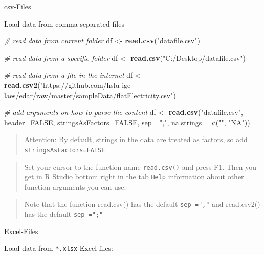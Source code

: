 \documentclass[
  a4paperpaper,
]{book}
\newenvironment{Shaded}{\begin{snugshade}}{\end{snugshade}}
\newcommand{\CommentTok}[1]{\textcolor[rgb]{0.56,0.35,0.01}{\textit{#1}}}
\newcommand{\DataTypeTok}[1]{\textcolor[rgb]{0.13,0.29,0.53}{#1}}
\newcommand{\KeywordTok}[1]{\textcolor[rgb]{0.13,0.29,0.53}{\textbf{#1}}}
\newcommand{\NormalTok}[1]{#1}
\newcommand{\OtherTok}[1]{\textcolor[rgb]{0.56,0.35,0.01}{#1}}
\newcommand{\StringTok}[1]{\textcolor[rgb]{0.31,0.60,0.02}{#1}}
\let\oldShaded\Shaded
\let\endoldShaded\endShaded
\renewenvironment{Shaded}{\footnotesize\oldShaded}{\endoldShaded}
\begin{document}
csv-Files

Load data from comma separated files

\begin{Shaded}
\begin{Highlighting}[]
\CommentTok{# read data from current folder}
\NormalTok{df <-}\StringTok{ }\KeywordTok{read.csv}\NormalTok{(}\StringTok{"datafile.csv"}\NormalTok{)}

\CommentTok{# read data from a specific folder}
\NormalTok{df <-}\StringTok{ }\KeywordTok{read.csv}\NormalTok{(}\StringTok{"C:/Desktop/datafile.csv"}\NormalTok{)}

\CommentTok{# read data from a file in the internet}
\NormalTok{df <-}\StringTok{ }\KeywordTok{read.csv2}\NormalTok{(}\StringTok{"https://github.com/hslu-ige-laes/edar/raw/master/sampleData/flatElectricity.csv"}\NormalTok{)}

\CommentTok{# add arguments on how to parse the content}
\NormalTok{df <-}\StringTok{ }\KeywordTok{read.csv}\NormalTok{(}\StringTok{"datafile.csv"}\NormalTok{,}
               \DataTypeTok{header=}\OtherTok{FALSE}\NormalTok{,}
               \DataTypeTok{stringsAsFactors=}\OtherTok{FALSE}\NormalTok{,}
               \DataTypeTok{sep =}\StringTok{","}\NormalTok{,}
               \DataTypeTok{na.strings =} \KeywordTok{c}\NormalTok{(}\StringTok{""}\NormalTok{, }\StringTok{"NA"}\NormalTok{))}
\end{Highlighting}
\end{Shaded}

\begin{quote}
Attention: By default, strings in the data are treated as factors, so add \texttt{stringsAsFactors=FALSE}
\end{quote}

\begin{quote}
Set your cursor to the function name \texttt{read.csv()} and press F1. Then you get in R Studio bottom right in the tab \texttt{Help} information about other function arguments you can use.
\end{quote}

\begin{quote}
Note that the function read.csv() has the default \texttt{sep\ =","} and read.csv2() has the default \texttt{sep\ =";"}
\end{quote}

Excel-Files

Load data from \texttt{*.xlsx} Excel files:
\end{document}
